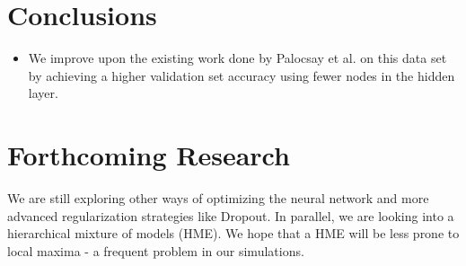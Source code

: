 \documentclass[a0,landscape]{a0poster}
\begin{document}
\begin{multicols}{4}
\color{SaddleBrown} %

\section*{Conclusions}

\begin{itemize}
\item We improve upon the existing work done by Palocsay et al. \cite{bib1} on this data set by achieving a higher validation set accuracy using fewer nodes in the hidden layer.
\end{itemize}

\color{DarkSlateGray} %


\section*{Forthcoming Research}

We are still exploring other ways of optimizing the neural network and more advanced regularization strategies like Dropout. In parallel, we are looking into a hierarchical mixture of models (HME). We hope that a HME will be less prone to local maxima - a frequent problem in our simulations.


\nocite{*}




\end{multicols}
\end{document}
